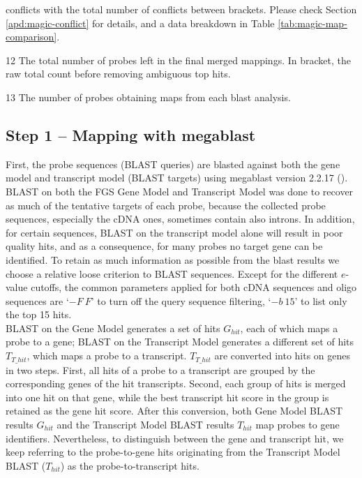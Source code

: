 \begin{table}
\begin{threeparttable}
\begin{scriptsize}
\begin{tablenotes}
		conflicts with the total number of conflicts between brackets. Please 
		check Section \ref{apd:magic-conflict} for details, and a data 
		breakdown in Table \ref{tab:magic-map-comparison}.
	\item[12] The total number of probes left in the final merged mappings. In 
		bracket, the raw total count before removing ambiguous top hits.
	\item[13] The number of probes obtaining maps from each blast analysis.
	\end{tablenotes}
	\end{scriptsize}
	\end{threeparttable}
\end{table}



\subsection{Step 1 – Mapping with megablast}

First, the probe sequences (BLAST queries) are blasted against both the gene 
model and transcript model (BLAST targets) using megablast version 2.2.17  
(\cite{Zhang2000}). 
BLAST on both the FGS Gene Model and Transcript Model was done to recover as 
much of the tentative targets of each probe, because the collected probe 
sequences, especially the cDNA ones, sometimes contain also 
introns.  
In addition, for certain  sequences, BLAST on the transcript model 
alone will result in poor quality hits, and as a consequence, for many probes 
no target gene can be identified. 
To retain as much information as possible from the blast results we choose a 
relative loose criterion to BLAST sequences. 
Except for the different $e$-value cutoffs, the common parameters applied for 
both cDNA sequences and oligo sequences are ‘$-F\:F$’ to turn off the query 
sequence filtering, ‘$-b\:15$’ to list only the top 15 hits. \\
BLAST on the Gene Model generates a set of hits $G_{hit}$, each of which maps a 
probe to a gene; BLAST on the Transcript Model generates a different set of 
hits $T_{T\_hit}$, which maps a probe to a transcript. 
$T_{T\_hit}$ are converted into hits on genes in two steps. 
First, all hits of a probe to a transcript are grouped by the 
corresponding genes of the hit transcripts. 
Second, each group of hits is merged into one hit on that gene, while the best 
transcript hit score in the group is retained as the gene hit score. 
After this conversion, both Gene Model BLAST results $G_{hit}$  and the 
Transcript Model BLAST results $T_{hit}$ map probes to gene identifiers. 
Nevertheless, to distinguish between the gene and transcript hit, we keep 
referring to the probe-to-gene hits originating from the Transcript 
Model BLAST ($T_{hit}$) as the probe-to-transcript hits.  

